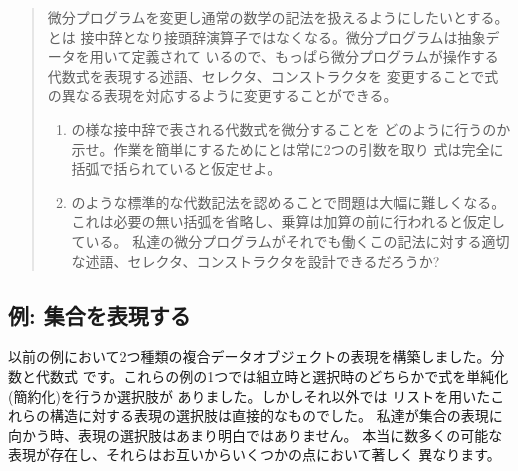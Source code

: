 \begin{quote}
微分プログラムを変更し通常の数学の記法を扱えるようにしたいとする。\code{+}と\code{*}は
接中辞となり接頭辞演算子ではなくなる。微分プログラムは抽象データを用いて定義されて
いるので、もっぱら微分プログラムが操作する代数式を表現する述語、セレクタ、コンストラクタを
変更することで式の異なる表現を対応するように変更することができる。

\begin{enumerate}[a]

\item
{}の様な接中辞で表される代数式を微分することを
どのように行うのか示せ。作業を簡単にするために\code{+}と\code{*}は常に2つの引数を取り
式は完全に括弧で括られていると仮定せよ。

\item
{}のような標準的な代数記法を認めることで問題は大幅に難しくなる。
これは必要の無い括弧を省略し、乗算は加算の前に行われると仮定している。
私達の微分プログラムがそれでも働くこの記法に対する適切な述語、セレクタ、コンストラクタを設計できるだろうか?

\end{enumerate}
\end{quote}

\subsection{例: 集合を表現する}
\label{Section 2.3.3}



以前の例において2つ種類の複合データオブジェクトの表現を構築しました。分数と代数式
です。これらの例の1つでは組立時と選択時のどちらかで式を単純化(簡約化)を行うか選択肢が
ありました。しかしそれ以外では
リストを用いたこれらの構造に対する表現の選択肢は直接的なものでした。
私達が集合の表現に向かう時、表現の選択肢はあまり明白ではありません。
本当に数多くの可能な表現が存在し、それらはお互いからいくつかの点において著しく
異なります。



